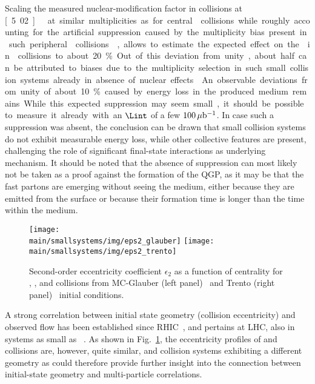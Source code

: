 \documentclass[../report.tex]{subfiles}
\providecommand{\main}{..}
\begin{document}
Scaling the measured nuclear-modification factor in \PbPb collisions at \unit[5.02]{\UTeV}~\cite{Acharya:2018qsh} at similar multiplicities as for central \OO collisions while roughly accounting for the artificial suppression caused by the multiplicity bias present in such peripheral \PbPb collisions~\cite{Acharya:2018njl}, allows to estimate the expected effect on the \RAA in \OO collisions to about 20\%.
Out of this deviation from unity, about half can be attributed to biases due to the multiplicity selection in such small collision systems already in absence of nuclear effects~\cite{Adam:2014qja}. An observable deviations from unity of about 10\% caused by energy loss in the produced medium remains. While this expected suppression may seem small, it should be possible to measure it already with an $\Lint$ of a few $\unit[100]{\mu b^{-1}}$. 
In case such a suppression was absent, the conclusion can be drawn that small collision systems do not exhibit measurable energy loss, while other collective features are present, challenging the role of significant final-state interactions as underlying mechanism.
It should be noted that the absence of suppression can most likely not be taken as a proof against the formation of the QGP, as it may be that the fast partons are emerging without seeing the medium, either because they are emitted from the surface or because their formation time is longer than the time within the medium.

\begin{figure}[t]
\centering
\texttt{[image: \\main/smallsystems/img/eps2\_glauber]}
\hfill
\texttt{[image: \\main/smallsystems/img/eps2\_trento]}
\caption{Second-order eccentricity coefficient $\epsilon_2$ as a function of centrality for \OO, \ArAr, \XeXe and \PbPb collisions from MC-Glauber (left panel)~\cite{Miller:2007ri,Loizides:2017ack} and Trento (right panel)~\cite{Moreland:2014oya} initial conditions.}
\label{fig:smallsystems_ecc}
\end{figure}

A strong correlation between initial state geometry (collision eccentricity) and observed flow has been established since RHIC~\cite{Drescher:2007cd}, and pertains at LHC, also in systems as small as \XeXe~\cite{Acharya:2018ihu}. As shown in Fig.~\ref{fig:smallsystems_ecc}, the eccentricity profiles of \XeXe and \PbPb collisions are, however, quite similar, and collision systems exhibiting a different geometry as \OO could therefore provide further insight into the connection between initial-state geometry and multi-particle correlations.
\end{document}
